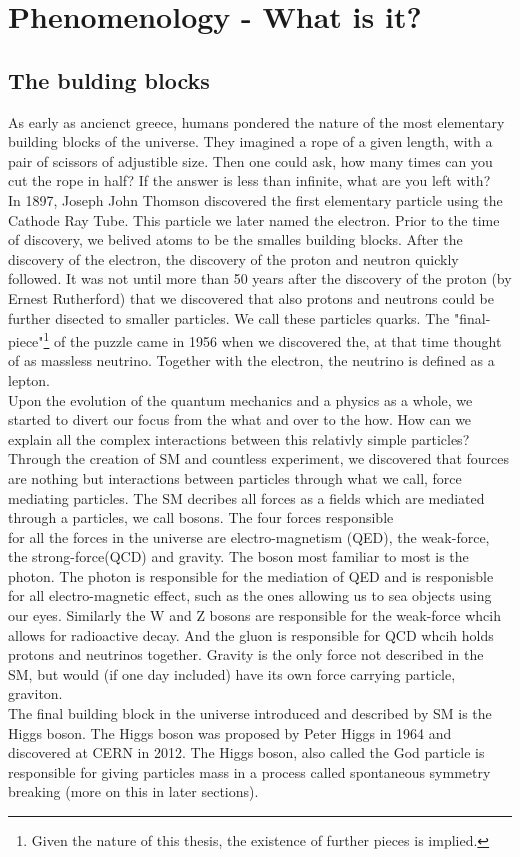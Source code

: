 \section{Phenomenology - What is it?}
\subsection{The bulding blocks}
As early as ancienct greece, humans pondered the nature of the most elementary building blocks of
the universe. They imagined a rope of a given length, with a pair of scissors of adjustible size.
Then one could ask, how many times can you cut the rope in half? If the answer is less than infinite,
what are you left with?
\\
In 1897, Joseph John Thomson discovered the first elementary particle using the Cathode Ray Tube. 
This particle we later named the electron. Prior to the time of discovery, we belived atoms to 
be the smalles building blocks. After the discovery of the electron, the discovery of the 
proton and neutron quickly followed. It was not until more than 50 years after the discovery of 
the proton (by Ernest Rutherford) that we discovered that also protons and neutrons could be further
disected to smaller particles. We call these particles quarks. The "final-piece"\footnote{Given the
nature of this thesis, the existence of further pieces is implied.} of the puzzle came
in 1956 when we discovered the, at that time thought of as massless neutrino. Together
with the electron, the neutrino is defined as a lepton. 
\\
Upon the evolution of the quantum mechanics and a physics as a whole, we started to divert
our focus from the what and over to the how. How can we explain all the complex interactions
between this relativly simple particles? Through the creation of \ac{SM} and countless 
experiment, we discovered that fources are nothing but interactions between particles
through what we call, force mediating particles. The \ac{SM} decribes all forces as a fields which 
are mediated through a particles, we call bosons. 
The four forces responsible
\\
for all the forces in the universe are electro-magnetism (\ac{QED}), the weak-force, the strong-force(\ac{QCD})
and gravity. The boson most familiar to most is the photon. The photon is responsible for the mediation 
of \ac{QED} and is responisble for all electro-magnetic effect, such as the ones allowing
us to sea objects using our eyes. Similarly the W and Z bosons are responsible for the weak-force whcih
allows for radioactive decay. And the gluon is responsible for \ac{QCD} whcih holds protons and 
neutrinos together. Gravity is the only force not described in the SM, but would (if one day included)
have its own force carrying particle, graviton.
\\
The final building block in the universe introduced and described by \ac{SM} is the Higgs boson.
The Higgs boson was proposed by Peter Higgs in 1964 and discovered at CERN in 2012. The Higgs boson,
also called the God particle is responsible for giving particles mass in a process called
spontaneous symmetry breaking (more on this in later sections). 
\\
